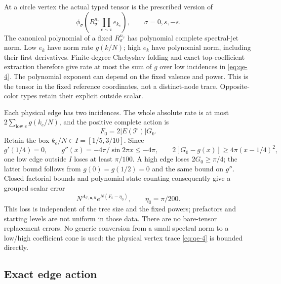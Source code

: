 At a circle vertex the actual typed tensor is the prescribed version of
\begin{equation}
\phi_\sigma\!\left(R_\sigma^{n_v}
                                          \prod_{e\sim v}e_{k_e}\right),
                   \qquad \sigma=0,s,-s.
\label{eq:qe-4}
\end{equation}
The canonical polynomial of a fixed \(R_\sigma^{n_v}\) has polynomial complete spectral-jet norm. Low \(e_k\) have norm rate \(g(k/N)\); high \(e_k\) have polynomial norm, including their first derivatives. Finite-degree Chebyshev folding and exact top-coefficient extraction therefore give rate at most the sum of \(g\) over low incidences in \eqref{eq:qe-4}. The polynomial exponent can depend on the fixed valence and power. This is the tensor in the fixed reference coordinates, not a distinct-node trace. Opposite-color types retain their explicit outside scalar.

Each physical edge has two incidences. The whole absolute rate is at most \(2\sum_{\text{low }e}g(k_e/N)\), and the positive complete action is
\begin{equation}
F_0=2|E(\mathcal T)|G_0.
\label{eq:qe-5}
\end{equation}
Retain the box \(k_e/N\in I=[1/5,3/10]\). Since
\begin{equation}
g'(1/4)=0,\qquad
 g''(x)=-4\pi/\sin2\pi x\le-4\pi,\qquad
 2[G_0-g(x)]\ge4\pi(x-1/4)^2,
\label{eq:qe-6}
\end{equation}
one low edge outside \(I\) loses at least \(\pi/100\). A high edge loses \(2G_0\ge\pi/4\); the latter bound follows
from \(g(0)=g(1/2)=0\) and the same bound on \(g''\). Closed factorial bounds and polynomial state counting consequently give a grouped scalar error
\begin{equation}
N^{A_{\mathcal T,\mathbf n,R}}
              e^{N(F_0-\eta_0)},\qquad \eta_0=\pi/200.
\label{eq:qe-7}
\end{equation}
This loss is independent of the tree size and the fixed powers; prefactors and starting levels are not uniform in those data. There are no bare-tensor replacement errors. No generic conversion from a small spectral norm to a low/high coefficient cone is used: the physical vertex trace \eqref{eq:qe-4} is bounded directly.

\subsection{Exact edge action}\label{sec:qe-4}

